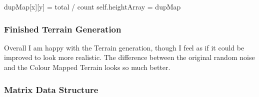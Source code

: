 \begin{flushleft}
\begin{pythoncode}
            dupMap[x][y] = total / count
    self.heightArray = dupMap
            \end{pythoncode}
            \subsubsection{Finished Terrain Generation}
            \vspace{0.25cm}

            Overall I am happy with the Terrain generation, though I feel as if it could be improved to look more realistic.
            The difference between the original random noise and the Colour Mapped Terrain looks so much better.

            \begin{figure}[h]
                \centering
                \qquad
            \end{figure}
            \subsubsection{Matrix Data Structure}
                \vspace{0.25cm}


\end{flushleft}
